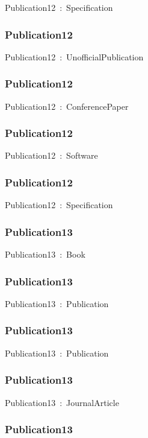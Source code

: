 \documentclass{article}
\begin{document}
Publication12~:~Specification

\subsubsection*{Publication12}

Publication12~:~UnofficialPublication

\subsubsection*{Publication12}

Publication12~:~ConferencePaper

\subsubsection*{Publication12}

Publication12~:~Software

\subsubsection*{Publication12}

Publication12~:~Specification

\subsubsection*{Publication13}

Publication13~:~Book

\subsubsection*{Publication13}

Publication13~:~Publication

\subsubsection*{Publication13}

Publication13~:~Publication

\subsubsection*{Publication13}

Publication13~:~JournalArticle

\subsubsection*{Publication13}
\end{document}
